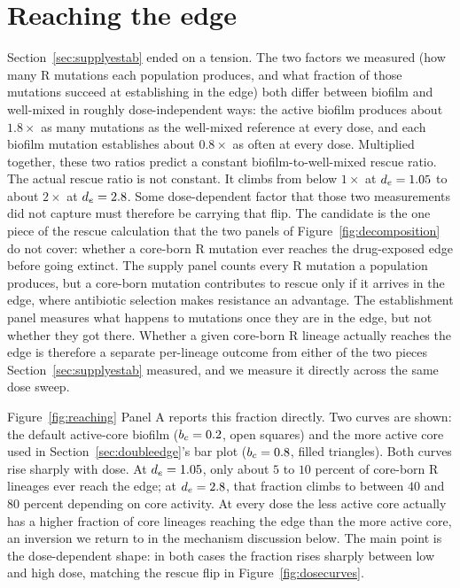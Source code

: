 \section{Reaching the edge}
\label{sec:reachingedge}

Section~\ref{sec:supplyestab} ended on a tension. The two factors we measured (how many R mutations each population produces, and what fraction of those mutations succeed at establishing in the edge) both differ between biofilm and well-mixed in roughly dose-independent ways: the active biofilm produces about $1.8\times$ as many mutations as the well-mixed reference at every dose, and each biofilm mutation establishes about $0.8\times$ as often at every dose. Multiplied together, these two ratios predict a constant biofilm-to-well-mixed rescue ratio. The actual rescue ratio is not constant. It climbs from below $1\times$ at $d_e = 1.05$ to about $2\times$ at $d_e = 2.8$. Some dose-dependent factor that those two measurements did not capture must therefore be carrying that flip. The candidate is the one piece of the rescue calculation that the two panels of Figure~\ref{fig:decomposition} do not cover: whether a core-born R mutation ever reaches the drug-exposed edge before going extinct. The supply panel counts every R mutation a population produces, but a core-born mutation contributes to rescue only if it arrives in the edge, where antibiotic selection makes resistance an advantage. The establishment panel measures what happens to mutations once they are in the edge, but not whether they got there. Whether a given core-born R lineage actually reaches the edge is therefore a separate per-lineage outcome from either of the two pieces Section~\ref{sec:supplyestab} measured, and we measure it directly across the same dose sweep.

Figure~\ref{fig:reaching} Panel A reports this fraction directly. Two curves are shown: the default active-core biofilm ($b_c = 0.2$, open squares) and the more active core used in Section~\ref{sec:doubleedge}'s bar plot ($b_c = 0.8$, filled triangles). Both curves rise sharply with dose. At $d_e = 1.05$, only about $5$ to $10$ percent of core-born R lineages ever reach the edge; at $d_e = 2.8$, that fraction climbs to between $40$ and $80$ percent depending on core activity. At every dose the less active core actually has a higher fraction of core lineages reaching the edge than the more active core, an inversion we return to in the mechanism discussion below. The main point is the dose-dependent shape: in both cases the fraction rises sharply between low and high dose, matching the rescue flip in Figure~\ref{fig:dosecurves}.

